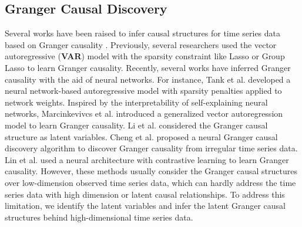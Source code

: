 \subsection{Granger Causal Discovery}
Several works have been raised to infer causal structures for time series data based on Granger causality \cite{diks2006new,granger1969investigating,marcinkevivcs2021interpretable,lowe2020amortized,lin2024root,gong2023causal}. Previously, several researchers used the vector autoregressive (\textbf{VAR}) model \cite{lozano2009grouped,hamilton2020time} with the sparsity constraint like Lasso or Group Lasso \cite{yuan2006model,tibshirani1996regression} to learn Granger causality. Recently, several works have inferred Granger causality with the aid of neural networks. For instance, Tank et al. \cite{tank2021neural} developed a neural network-based autoregressive model with sparsity penalties applied to network weights. Inspired by the interpretability of self-explaining neural networks, Marcinkevivcs et al. \cite{marcinkevivcs2021interpretable} introduced a generalized vector autoregression model to learn Granger causality. Li et al. \cite{li2023transferable} considered the Granger causal structure as latent variables. Cheng et al. \cite{cheng2023cuts,cheng2024cuts+} proposed a neural Granger causal discovery algorithm to discover Granger causality from irregular time series data. Lin et al. \cite{lin2024root} used a neural architecture with contrastive learning to learn Granger causality. However, these methods usually consider the Granger causal structures over low-dimension observed time series data, which can hardly address the time series data with high dimension or latent causal relationships. To address this limitation, we identify the latent variables and infer the latent Granger causal structures behind high-dimensional time series data.

